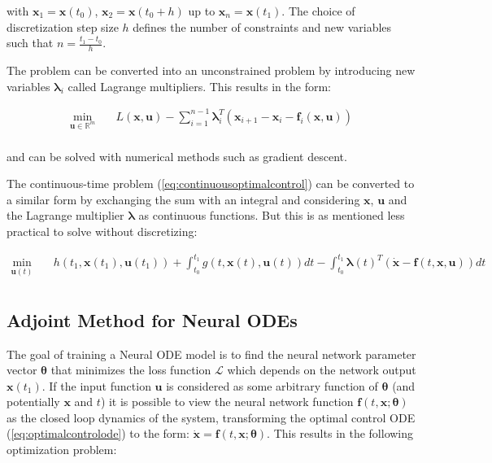 \noindent with $\bm{x}_1 = \bm{x}(t_0)$, $\bm{x}_2 = \bm{x}(t_0 + h)$ up to $\bm{x}_n = \bm{x}(t_1)$. The choice of discretization step size $h$ defines the number of constraints and new variables such that $n = \frac{t_1 - t_0}{h}$.

The problem can be converted into an unconstrained problem by introducing new variables $\bm{\lambda}_i$ called Lagrange multipliers. This results in the form:

\begin{equation}
    \begin{aligned}
        \min_{\bm{u} \in \mathbb{R}^{m}} \quad & L(\bm{x}, \bm{u}) - \sum_{i=1}^{n-1} \bm{\lambda}_i^T (\bm{x}_{i+1} - \bm{x}_i - \bm{f}_i(\bm{x}, \bm{u})) \\
    \end{aligned}
\end{equation}

\noindent and can be solved with numerical methods such as gradient descent.

The continuous-time problem (\ref{eq:continuousoptimalcontrol}) can be converted to a similar form by exchanging the sum with an integral and considering $\bm{x}$, $\bm{u}$ and the Lagrange multiplier $\bm{\lambda}$ as continuous functions. But this is as mentioned less practical to solve without discretizing:

\begin{equation}
    \begin{aligned}
        \min_{\bm{u}(t)} \quad & h(t_1, \bm{x}(t_1), \bm{u}(t_1)) + \int_{t_0}^{t_1} g(t, \bm{x}(t), \bm{u}(t)) dt - \int_{t_0}^{t_1} \bm{\lambda}(t)^T (\dot{\bm{x}} - \bm{f}(t, \bm{x}, \bm{u})) dt \\
    \end{aligned}
\end{equation}

\subsection{Adjoint Method for Neural ODEs}

The goal of training a Neural ODE model is to find the neural network parameter vector $\bm{\theta}$ that minimizes the loss function $\mathcal{L}$ which depends on the network output $\bm{x}(t_1)$. If the input function $\bm{u}$ is considered as some arbitrary function of $\bm{\theta}$ (and potentially $\bm{x}$ and $t$) it is possible to view the neural network function $\bm{f}(t, \bm{x}; \bm{\theta})$ as the closed loop dynamics of the system, transforming the optimal control ODE (\ref{eq:optimalcontrolode}) to the form: $\dot{\bm{x}} = \bm{f}(t, \bm{x}; \bm{\theta})$. This results in the following optimization problem:

